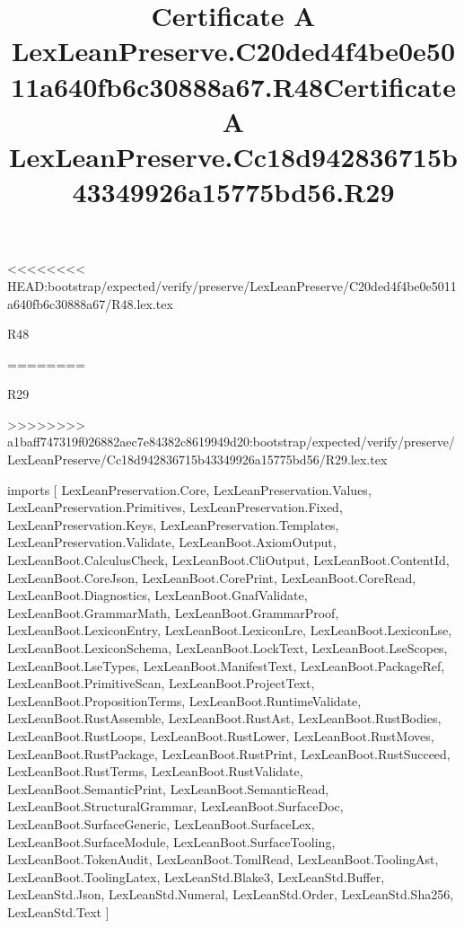 <<<<<<<< HEAD:bootstrap/expected/verify/preserve/LexLeanPreserve/C20ded4f4be0e5011a640fb6c30888a67/R48.lex.tex
\begin{lexlean}{R48}
\title{Certificate A LexLeanPreserve.C20ded4f4be0e5011a640fb6c30888a67.R48}
========
\begin{lexlean}{R29}
\title{Certificate A LexLeanPreserve.Cc18d942836715b43349926a15775bd56.R29}
>>>>>>>> a1baff747319f026882aec7e84382c8619949d20:bootstrap/expected/verify/preserve/LexLeanPreserve/Cc18d942836715b43349926a15775bd56/R29.lex.tex
\begin{coremodule}
imports [
  LexLeanPreservation.Core,
  LexLeanPreservation.Values,
  LexLeanPreservation.Primitives,
  LexLeanPreservation.Fixed,
  LexLeanPreservation.Keys,
  LexLeanPreservation.Templates,
  LexLeanPreservation.Validate,
  LexLeanBoot.AxiomOutput,
  LexLeanBoot.CalculusCheck,
  LexLeanBoot.CliOutput,
  LexLeanBoot.ContentId,
  LexLeanBoot.CoreJson,
  LexLeanBoot.CorePrint,
  LexLeanBoot.CoreRead,
  LexLeanBoot.Diagnostics,
  LexLeanBoot.GnafValidate,
  LexLeanBoot.GrammarMath,
  LexLeanBoot.GrammarProof,
  LexLeanBoot.LexiconEntry,
  LexLeanBoot.LexiconLre,
  LexLeanBoot.LexiconLse,
  LexLeanBoot.LexiconSchema,
  LexLeanBoot.LockText,
  LexLeanBoot.LseScopes,
  LexLeanBoot.LseTypes,
  LexLeanBoot.ManifestText,
  LexLeanBoot.PackageRef,
  LexLeanBoot.PrimitiveScan,
  LexLeanBoot.ProjectText,
  LexLeanBoot.PropositionTerms,
  LexLeanBoot.RuntimeValidate,
  LexLeanBoot.RustAssemble,
  LexLeanBoot.RustAst,
  LexLeanBoot.RustBodies,
  LexLeanBoot.RustLoops,
  LexLeanBoot.RustLower,
  LexLeanBoot.RustMoves,
  LexLeanBoot.RustPackage,
  LexLeanBoot.RustPrint,
  LexLeanBoot.RustSucceed,
  LexLeanBoot.RustTerms,
  LexLeanBoot.RustValidate,
  LexLeanBoot.SemanticPrint,
  LexLeanBoot.SemanticRead,
  LexLeanBoot.StructuralGrammar,
  LexLeanBoot.SurfaceDoc,
  LexLeanBoot.SurfaceGeneric,
  LexLeanBoot.SurfaceLex,
  LexLeanBoot.SurfaceModule,
  LexLeanBoot.SurfaceTooling,
  LexLeanBoot.TokenAudit,
  LexLeanBoot.TomlRead,
  LexLeanBoot.ToolingAst,
  LexLeanBoot.ToolingLatex,
  LexLeanStd.Blake3,
  LexLeanStd.Buffer,
  LexLeanStd.Json,
  LexLeanStd.Numeral,
  LexLeanStd.Order,
  LexLeanStd.Sha256,
  LexLeanStd.Text
]


\end{coremodule}
\end{lexlean}
\end{lexlean}
